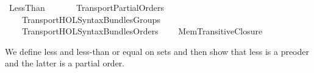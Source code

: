 %
\begin{isabellebody}%
%
%
\isadelimdocument
%
\endisadelimdocument
%
\isatagdocument
\isanewline
%
\isamarkuptrue%
%
\endisatagdocument
{\isafolddocument}%
%
\isadelimdocument
%
\endisadelimdocument
%
\isadelimtheory
%
\endisadelimtheory
%
\isatagtheory
{}\isamarkupfalse%
\ Less{\isacharunderscore}{\kern0pt}Than\isanewline
\ \ \isanewline
\ \ \ \ Transport{\isachardot}{\kern0pt}Partial{\isacharunderscore}{\kern0pt}Orders\isanewline
\ \ \ \ Transport{\isachardot}{\kern0pt}HOL{\isacharunderscore}{\kern0pt}Syntax{\isacharunderscore}{\kern0pt}Bundles{\isacharunderscore}{\kern0pt}Groups\isanewline
\ \ \ \ Transport{\isachardot}{\kern0pt}HOL{\isacharunderscore}{\kern0pt}Syntax{\isacharunderscore}{\kern0pt}Bundles{\isacharunderscore}{\kern0pt}Orders\isanewline
\ \ \ \ Mem{\isacharunderscore}{\kern0pt}Transitive{\isacharunderscore}{\kern0pt}Closure\isanewline
{}%
\endisatagtheory
{\isafoldtheory}%
%
\isadelimtheory
%
\endisadelimtheory
%
\isadelimdocument
%
\endisadelimdocument
%
\isatagdocument
%
\isamarkuptrue%
%
\endisatagdocument
{\isafolddocument}%
%
\isadelimdocument
%
\endisadelimdocument
%
\begin{isamarkuptext}%
We define less and less-than or equal on sets and then
show that less is a preoder and the latter is a partial order.


\end{isamarkuptext}
\end{isabellebody}
